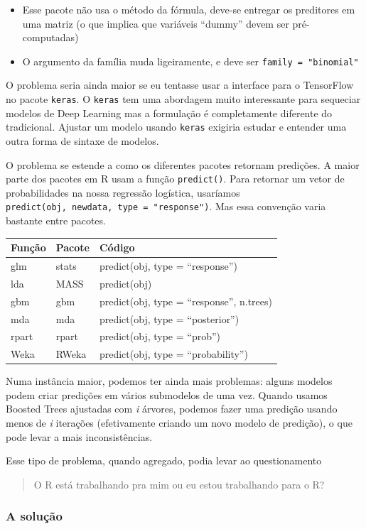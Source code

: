 \documentclass[
]{article}
\providecommand{\tightlist}{%
  \setlength{\itemsep}{0pt}\setlength{\parskip}{0pt}}
\begin{document}
\begin{itemize}
\tightlist
\item
  Esse pacote não usa o método da fórmula, deve-se entregar os
  preditores em uma matriz (o que implica que variáveis ``dummy'' devem
  ser pré-computadas)
\item
  O argumento da família muda ligeiramente, e deve ser
  \texttt{family\ =\ "binomial"}
\end{itemize}

O problema seria ainda maior se eu tentasse usar a interface para o
TensorFlow no pacote \texttt{keras}. O \texttt{keras} tem uma abordagem
muito interessante para sequeciar modelos de Deep Learning mas a
formulação é completamente diferente do tradicional. Ajustar um modelo
usando \texttt{keras} exigiria estudar e entender uma outra forma de
sintaxe de modelos.

O problema se estende a como os diferentes pacotes retornam predições. A
maior parte dos pacotes em R usam a função \texttt{predict()}. Para
retornar um vetor de probabilidades na nossa regressão logística,
usaríamos \texttt{predict(obj,\ newdata,\ type\ =\ "response")}. Mas
essa convenção varia bastante entre pacotes.

\begin{longtable}[]{@{}lll@{}}
\toprule
Função & Pacote & Código\tabularnewline
\midrule
\endhead
glm & stats & predict(obj, type = ``response'')\tabularnewline
lda & MASS & predict(obj)\tabularnewline
gbm & gbm & predict(obj, type = ``response'', n.trees)\tabularnewline
mda & mda & predict(obj, type = ``posterior'')\tabularnewline
rpart & rpart & predict(obj, type = ``prob'')\tabularnewline
Weka & RWeka & predict(obj, type = ``probability'')\tabularnewline
\bottomrule
\end{longtable}

Numa instância maior, podemos ter ainda mais problemas: alguns modelos
podem criar predições em vários submodelos de uma vez. Quando usamos
Boosted Trees ajustadas com \emph{i} árvores, podemos fazer uma predição
usando menos de \emph{i} iterações (efetivamente criando um novo modelo
de predição), o que pode levar a mais inconsistências.

Esse tipo de problema, quando agregado, podia levar ao questionamento

\begin{quote}
O R está trabalhando pra mim ou eu estou trabalhando para o R?
\end{quote}

\hypertarget{a-soluuxe7uxe3o}{%
\subsubsection{A solução}\label{a-soluuxe7uxe3o}}
\end{document}
